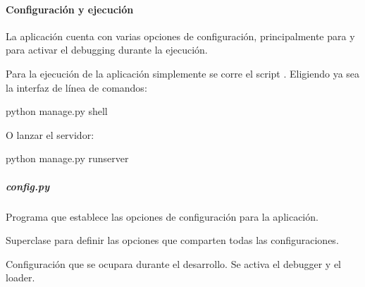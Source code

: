 \begin{fulllineitems}
\paragraph{Configuración y ejecución}
\label{\detokenize{chapter_two/desc_cloudnao:configuracion-y-ejecucion}}
La aplicación cuenta con varias opciones de configuración, principalmente
para  y para activar el debugging durante la ejecución.

Para la ejecución de la aplicación simplemente se corre el
script . Eligiendo ya sea la interfaz de línea de comandos:

\begin{sphinxVerbatim}[commandchars=\\\{\}]
\PYGZdl{} python manage.py shell
\end{sphinxVerbatim}

O lanzar el servidor:

\begin{sphinxVerbatim}[commandchars=\\\{\}]
\PYGZdl{} python manage.py runserver
\end{sphinxVerbatim}


\subparagraph{config.py}
\label{\detokenize{chapter_two/desc_cloudnao:config-py}}\label{\detokenize{chapter_two/desc_cloudnao:module-config}}
Programa que establece las opciones de configuración para la
aplicación.

\begin{fulllineitems}
\label{\detokenize{chapter_two/desc_cloudnao:config.Config}}
Superclase para definir las opciones que comparten
todas las configuraciones.

\end{fulllineitems}


\begin{fulllineitems}
\label{\detokenize{chapter_two/desc_cloudnao:config.DevelopmentConfig}}
Configuración que se ocupara durante el desarrollo.
Se activa el debugger y el loader.

\end{fulllineitems}



\end{fulllineitems}
